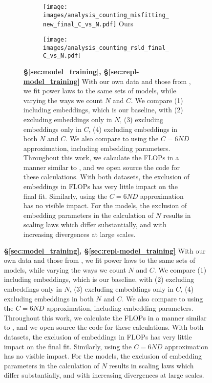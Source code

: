 \begin{figure}[]
\ContinuedFloat
\centering 

    
\begin{subfigure}{\textwidth}
\begin{subfigure}{0.49\textwidth}
    \centering
    \texttt{[image: images/analysis\_counting\_misfitting\_new\_final\_C\_vs\_N.pdf]}
    \footnotesize{Ours}
    \label{fig:analysis_form_epoch}
\end{subfigure}
\hfill
\begin{subfigure}{0.49\textwidth}
    \centering
    \texttt{[image: images/analysis\_counting\_rsld\_final\_C\_vs\_N.pdf]}
    \footnotesize{\citet{porian2024resolving}}
    \label{fig:analysis_form_ours}
\end{subfigure}
\vspace{1em}

    
    \caption{\textbf{\S\ref{sec:model_training}, \S\ref{sec:repl-model_training}} With our own data and those from \citet{porian2024resolving}, we fit power laws to the same sets of models, while varying the ways we count $N$ and $C$. We compare (1) including embeddings, which is our baseline, with (2) excluding embeddings only in $N$, (3) excluding embeddings only in $C$, (4) excluding embeddings in both $N$ and $C$. We also compare to using the $C=6ND$ approximation, including embedding parameters. Throughout this work, we calculate the FLOPs in a manner similar to \citet{hoffmann2022training}, and we open source the code for these calculations.
    With both datasets, the exclusion of embeddings in FLOPs has very little impact on the final fit. Similarly, using the $C=6ND$ approximation has no visible impact. For the \citet{porian2024resolving} models, the exclusion of embedding parameters in the calculation of $N$ results in scaling laws which differ substantially, and with increasing divergences at large scales. 
    }
    \label{fig:analysis_counting_ours}
\end{subfigure}

\end{figure}
